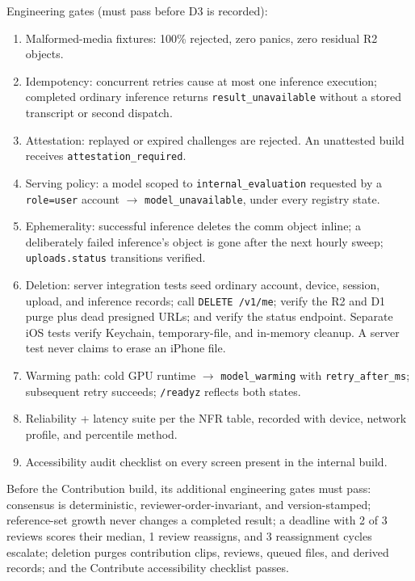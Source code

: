 \documentclass[11pt]{article}
\newcommand{\code}[1]{\texttt{#1}}
\begin{document}
Engineering gates (must pass before D3 is recorded):

\begin{enumerate}[nosep]
  \item Malformed-media fixtures: 100\% rejected, zero panics, zero residual R2
        objects.
  \item Idempotency: concurrent retries cause at most one inference execution;
        completed ordinary inference returns \code{result\_unavailable} without a
        stored transcript or second dispatch.
  \item Attestation: replayed or expired challenges are rejected. An unattested
        build receives \code{attestation\_required}.
  \item Serving policy: a model scoped to \code{internal\_evaluation} requested by
        a \code{role=user} account $\to$ \code{model\_unavailable}, under every
        registry state.
  \item Ephemerality: successful inference deletes the comm object inline; a
        deliberately failed inference's object is gone after the next hourly
        sweep; \code{uploads.status} transitions verified.
  \item Deletion: server integration tests seed ordinary account, device, session,
        upload, and inference records; call \code{DELETE /v1/me}; verify the R2 and
        D1 purge plus dead presigned URLs; and verify the status endpoint. Separate
        iOS tests verify Keychain, temporary-file, and in-memory cleanup. A server
        test never claims to erase an iPhone file.
  \item Warming path: cold GPU runtime $\to$ \code{model\_warming} with
        \code{retry\_after\_ms}; subsequent retry succeeds; \code{/readyz}
        reflects both states.
  \item Reliability + latency suite per the NFR table, recorded with device,
        network profile, and percentile method.
  \item Accessibility audit checklist on every screen present in the internal build.
\end{enumerate}

Before the Contribution build, its additional engineering gates must pass:
consensus is deterministic, reviewer-order-invariant, and version-stamped;
reference-set growth never changes a completed result; a deadline with 2 of 3
reviews scores their median, 1 review reassigns, and 3 reassignment cycles escalate;
deletion purges contribution clips, reviews, queued files, and derived records; and
the Contribute accessibility checklist passes.
\end{document}
